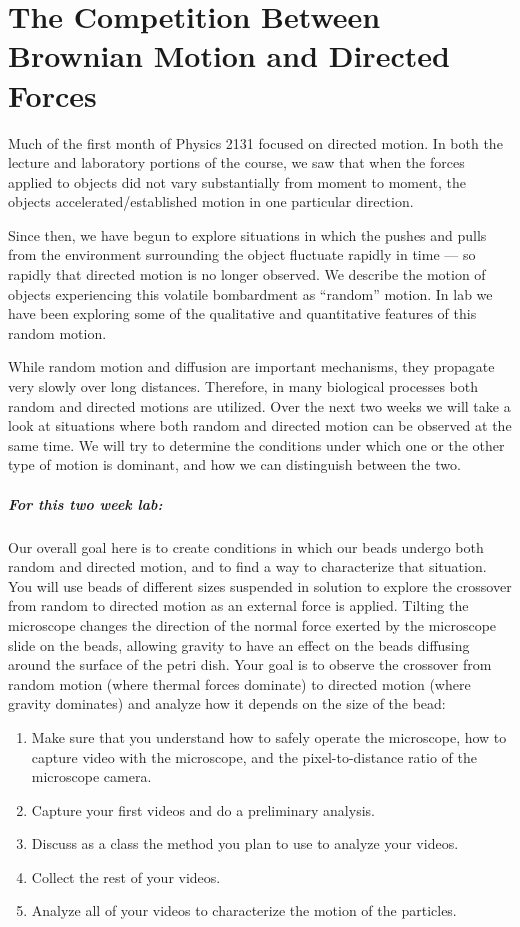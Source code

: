 \chapter{The Competition Between Brownian Motion and Directed Forces}
\thispagestyle{fancy}
%
Much of the first month of Physics 2131 focused on directed motion.
In both the lecture and laboratory portions of the course, we saw that when the forces applied to objects did not vary substantially from moment to moment, the objects accelerated/established motion in one particular direction.
\par
Since then, we have begun to explore situations in which the pushes and pulls from the environment surrounding the object fluctuate rapidly in time — so rapidly that directed motion is no longer observed. 
We describe the motion of objects experiencing this volatile bombardment as ``random'' motion. 
In lab we have been exploring some of the qualitative and quantitative features of this random motion.
\par
While random motion and diffusion are important mechanisms, they propagate very slowly over long distances. 
Therefore, in many biological processes both random and directed motions are utilized. 
Over the next two weeks we will take a look at situations where both random and directed motion can be observed at the same time. 
We will try to determine the conditions under which one or the other type of motion is dominant, and how we can distinguish between the two.
%
\paragraph{For this two week lab:} Our overall goal here is to create conditions in which our beads undergo both random and directed motion, and to find a way to characterize that situation. 
You will use beads of different sizes suspended in solution to explore the crossover from random to directed motion as an external force is applied.
Tilting the microscope changes the direction of the normal force exerted by the microscope slide on the beads, allowing gravity to have an effect on the beads diffusing around the surface of the petri dish.
Your goal is to observe the crossover from random motion (where thermal forces dominate) to directed motion (where gravity dominates) and analyze how it depends on the size of the bead:
\begin{enumerate}
\item Make sure that you understand how to safely operate the microscope, how to capture video with the microscope, and the pixel-to-distance ratio of the microscope camera.
\item Capture your first videos and do a preliminary analysis.
\item Discuss as a class the method you plan to use to analyze your videos.
\item Collect the rest of your videos.
\item Analyze all of your videos to characterize the motion of the particles.
\end{enumerate}
%
